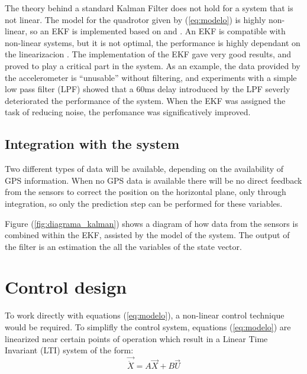 \documentclass[conference]{IEEEtran}
\newcommand{\refp}[1]{(\ref{#1})}
\begin{document}
The theory behind a standard Kalman Filter does not hold for a system that is not linear. The model for the quadrotor given by \refp{eq:modelo} is highly non-linear, so an EKF is implemented based on \cite{bib:kalman} and \cite{bib:kalman2}. An EKF is compatible with non-linear systems, but it is not optimal, the performance is highly dependant on the linearizacion \cite{bib:kay}. The implementation of the EKF gave very good results, and proved to play a critical part in the system. As an example, the data provided by the accelerometer is ``unusable'' without filtering, and experiments with a simple low pass filter (LPF) showed that a 60ms delay introduced by the LPF severly deteriorated the performance of the system. When the EKF was assigned the task of reducing noise, the perfomance was significatively improved.

\subsection{Integration with the system}
\label{sec:kalman-integration}


Two different types of data will be available, depending on the availability of GPS information. When no GPS data is available there will be no direct feedback from the sensors to correct the position on the horizontal plane, only through integration, so only the prediction step can be performed for these variables.


Figure \refp{fig:diagrama_kalman} shows a diagram of how data from the sensors is combined within the EKF, assisted by the model of the system. The output of the filter is an estimation the all the variables of the state vector.

\section{Control design}
\label{sec:control}

To work directly with equations \refp{eq:modelo}, a non-linear control technique would be required. To simplifly the control system, equations \refp{eq:modelo} are linearized near certain points of operation which result in a Linear Time Invariant (LTI) system of the form:
\begin{equation}
  \label{eq:lti}
  \vec{\dot{X}} = A\vec{X} + B\vec{U}
\end{equation}
\end{document}
